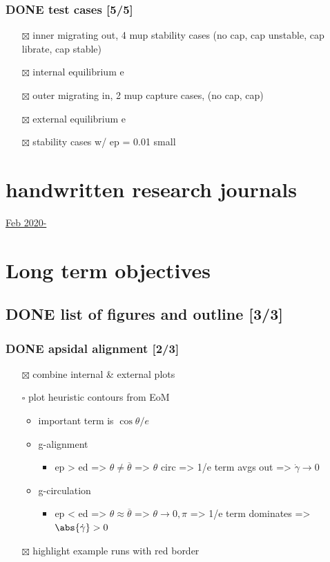 \documentclass[11pt]{article}
\begin{document}
\subsubsection{{\bfseries\sffamily DONE} test cases [5/5]}
\label{sec:orgd718f11}
\begin{itemize}
\item[{$\boxtimes$}] inner migrating out, 4 mup stability cases (no cap, cap unstable, cap librate, cap stable)
\item[{$\boxtimes$}] internal equilibrium e
\item[{$\boxtimes$}] outer migrating in, 2 mup capture cases, (no cap, cap)
\item[{$\boxtimes$}] external equilibrium e
\item[{$\boxtimes$}] stability cases w/ ep = 0.01 small
\end{itemize}
\section{handwritten research journals}
\label{sec:orgd119f31}
\href{file:///home/jtlaune/Dropbox/Apps/GoodNotes 5/GoodNotes/multi-planet-architecture/research-notes.pdf}{Feb 2020-}

\section{Long term objectives}
\label{sec:orge8606d9}
\subsection{{\bfseries\sffamily DONE} list of figures and outline [3/3]}
\label{sec:org4d55108}
\subsubsection{{\bfseries\sffamily DONE} apsidal alignment [2/3]}
\label{sec:org48340ce}
\begin{itemize}
\item[{$\boxtimes$}] combine internal \& external plots
\item[{$\square$}] plot heuristic contours from EoM
\begin{itemize}
\item important term is \(\cos\theta/e\)
\item g-alignment 
\begin{itemize}
\item ep > ed => \(\theta\neq\overline{\theta}\) => \(\theta\) circ => 1/e term avgs out => \(\dot\gamma\to 0\)
\end{itemize}
\item g-circulation
\begin{itemize}
\item ep < ed => \(\theta\approx\overline{\theta}\) => \(\theta\to 0,\pi\) => 1/e term dominates => \(\abs{\dot\gamma}> 0\)
\end{itemize}
\end{itemize}
\item[{$\boxtimes$}] highlight example runs with red border
\end{itemize}
\end{document}

